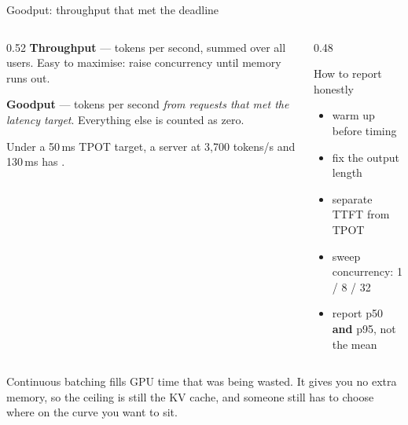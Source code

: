 \documentclass[aspectratio=169,10pt]{beamer}
\begin{document}
\begin{frame}[shrink=3]{Goodput: throughput that met the deadline}
  \begin{columns}[T]
    \begin{column}{0.52\textwidth}
      \textbf{Throughput} --- tokens per second, summed over all users.
      Easy to maximise: raise concurrency until memory runs out.
      \vspace{0.5em}

      \textbf{Goodput} --- tokens per second \emph{from requests that met the
      latency target}. Everything else is counted as zero.
      \vspace{0.6em}

      Under a 50\,ms TPOT target, a server at 3{,}700 tokens/s and 130\,ms has
      .
    \end{column}
    \begin{column}{0.48\textwidth}
      \begin{block}{How to report honestly}
        \small
        \begin{itemize}
          \item warm up before timing
          \item fix the output length
          \item separate TTFT from TPOT
          \item sweep concurrency: 1 / 8 / 32
          \item report p50 \textbf{and} p95, not the mean
        \end{itemize}
      \end{block}
    \end{column}
  \end{columns}
  \vfill
  \begin{takeaway}
    Continuous batching fills GPU time that was being wasted. It gives you no
    extra memory, so the ceiling is still the KV cache, and someone still has
    to choose where on the curve you want to sit.
  \end{takeaway}
\end{frame}
\end{document}
